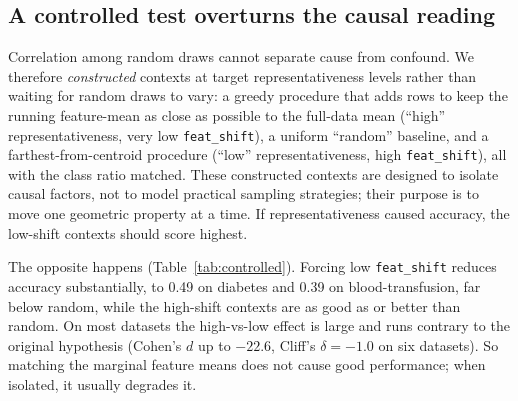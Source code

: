 \documentclass[11pt,a4paper]{article}
\begin{document}
\subsection{A controlled test overturns the causal reading}

Correlation among random draws cannot separate cause from confound. We therefore
\emph{constructed} contexts at target representativeness levels rather than
waiting for random draws to vary: a greedy procedure that adds rows to keep the
running feature-mean as close as possible to the full-data mean (``high''
representativeness, very low \texttt{feat\_shift}), a uniform ``random''
baseline, and a farthest-from-centroid procedure (``low'' representativeness,
high \texttt{feat\_shift}), all with the class ratio matched. These constructed
contexts are designed to isolate causal factors, not to model practical sampling
strategies; their purpose is to move one geometric property at a time. If
representativeness caused accuracy, the low-shift contexts should score highest.

The opposite happens (Table~\ref{tab:controlled}). Forcing low
\texttt{feat\_shift} reduces accuracy substantially, to 0.49 on diabetes and
0.39 on blood-transfusion, far below random, while the high-shift contexts are
as good as or better than random. On most datasets the high-vs-low effect is
large and runs contrary to the original hypothesis (Cohen's $d$ up to $-22.6$,
Cliff's $\delta=-1.0$ on six datasets). So matching the marginal feature means
does not cause good performance; when isolated, it usually degrades it.
\end{document}
